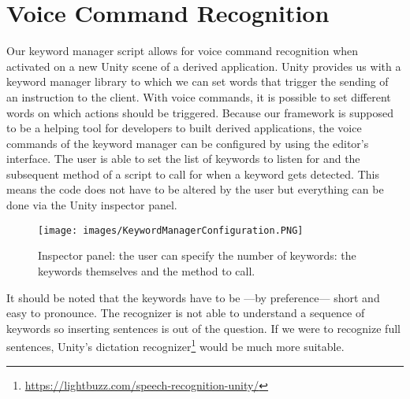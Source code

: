 \section{Voice Command Recognition}
Our keyword manager script allows for voice command recognition when activated on a new Unity scene of a derived application. Unity provides us with a keyword manager library to which we can set words that trigger the sending of an instruction to the client. With voice commands, it is possible to set different words on which actions should be triggered. Because our framework is supposed to be a helping tool for developers to built derived applications, the voice commands of the keyword manager can be configured by using the editor's interface. The user is able to set the list of keywords to listen for and the subsequent method of a script to call for when a keyword gets detected. This means the code does not have to be altered by the user but everything can be done via the Unity inspector panel.
\begin{figure}[!htb]
	\texttt{[image: images/KeywordManagerConfiguration.PNG]}
	\captionsetup{width=1.0\textwidth}
	\centering
	\caption{Inspector panel: the user can specify the number of keywords: the keywords themselves and the method to call.} 
\end{figure}\mbox{}\newline
It should be noted that the keywords have to be ---by preference--- short and easy to pronounce. The recognizer is not able to understand a sequence of keywords so inserting sentences is out of the question. If we were to recognize full sentences, Unity's dictation recognizer\footnote{\protect\url{https://lightbuzz.com/speech-recognition-unity/}} would be much more suitable.

